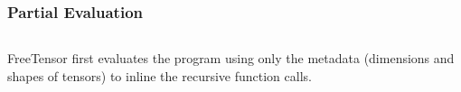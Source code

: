 \documentclass[12pt,aspectratio=169]{beamer}
\begin{document}
    \begin{frame}
        \frametitle{Partial Evaluation}

        \begin{columns}
            \begin{column}{0.5\textwidth}
                FreeTensor first evaluates the program using only the metadata (dimensions and shapes of tensors) to inline the recursive function calls.
                \vspace{4em}
            \end{column}
        \end{columns}
    \end{frame}
\end{document}
